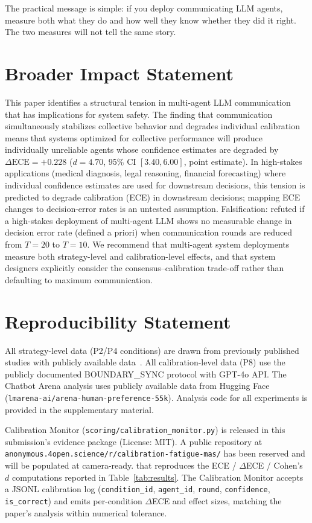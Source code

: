\documentclass[11pt]{article}
\begin{document}
The practical message is simple: if you deploy communicating LLM agents, measure both what they do and how well they know whether they did it right. The two measures will not tell the same story.

\section*{Broader Impact Statement}

This paper identifies a structural tension in multi-agent LLM communication that has implications for system safety. The finding that communication simultaneously stabilizes collective behavior and degrades individual calibration means that systems optimized for collective performance will produce individually unreliable agents whose confidence estimates are degraded by $\Delta\text{ECE} = +0.228$ ($d = 4.70$, 95\% CI $[3.40, 6.00]$, point estimate). In high-stakes applications (medical diagnosis, legal reasoning, financial forecasting) where individual confidence estimates are used for downstream decisions, this tension is predicted to degrade calibration (ECE) in downstream decisions; mapping ECE changes to decision-error rates is an untested assumption. Falsification: refuted if a high-stakes deployment of multi-agent LLM shows no measurable change in decision error rate (defined a priori) when communication rounds are reduced from $T = 20$ to $T = 10$. We recommend that multi-agent system deployments measure both strategy-level and calibration-level effects, and that system designers explicitly consider the consensus--calibration trade-off rather than defaulting to maximum communication.

\section*{Reproducibility Statement}

All strategy-level data (P2/P4 conditions) are drawn from previously published studies with publicly available data~\cite{mmepc2026}. All calibration-level data (P8) use the publicly documented BOUNDARY\_SYNC protocol with GPT-4o API. The Chatbot Arena analysis uses publicly available data from Hugging Face (\texttt{lmarena-ai/arena-human-preference-55k}). Analysis code for all experiments is provided in the supplementary material.

Calibration Monitor (\texttt{scoring/calibration\_monitor.py}) is released in this submission's evidence package (License: MIT). A public repository at \texttt{anonymous.4open.science/r/calibration-fatigue-mas/} has been reserved and will be populated at camera-ready.
that reproduces the ECE / $\Delta$ECE / Cohen's $d$ computations reported in
Table~\ref{tab:results}. The Calibration Monitor accepts a JSONL
calibration log (\texttt{condition\_id}, \texttt{agent\_id}, \texttt{round},
\texttt{confidence}, \texttt{is\_correct}) and emits per-condition
$\Delta$ECE and effect sizes, matching the paper's analysis within numerical
tolerance.
\end{document}
